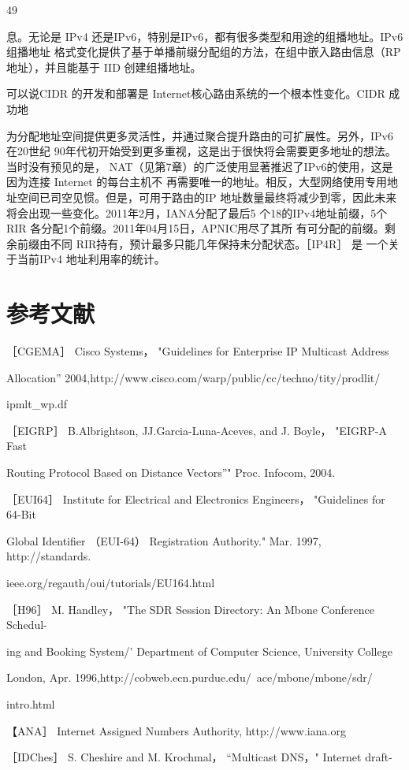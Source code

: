 49

息。无论是 IPv4 还是IPv6，特别是IPv6，都有很多类型和用途的组播地址。IPv6组播地址
格式变化提供了基于单播前缀分配组的方法，在组中嵌入路由信息（RP地址），并且能基于
IID 创建组播地址。

可以说CIDR 的开发和部署是 Internet核心路由系统的一个根本性变化。CIDR 成功地

为分配地址空间提供更多灵活性，并通过聚合提升路由的可扩展性。另外，IPv6 在20世纪
90年代初开始受到更多重视，这是出于很快将会需要更多地址的想法。当时没有预见的是，
NAT（见第7章）的广泛使用显著推迟了IPv6的使用，这是因为连接 Internet 的每台主机不
再需要唯一的地址。相反，大型网络使用专用地址空间已司空见惯。但是，可用于路由的IP
地址数量最终将减少到零，因此未来将会出现一些变化。2011年2月，IANA分配了最后5
个18的IPv4地址前缀，5个 RIR 各分配1个前缀。2011年04月15日，APNIC用尽了其所
有可分配的前缀。剩余前缀由不同 RIR持有，预计最多只能几年保持未分配状态。［IP4R］ 是
一个关于当前IPv4 地址利用率的统计。

\section{参考文献}
［CGEMA］ Cisco Systems， "Guidelines for Enterprise IP Multicast Address

Allocation” 2004,http://www.cisco.com/warp/public/cc/techno/tity/prodlit/

ipmlt\_wp.df

［EIGRP］ B.Albrightson, JJ.Garcia-Luna-Aceves, and J. Boyle， "EIGRP-A Fast

Routing Protocol Based on Distance Vectors”" Proc. Infocom, 2004.

［EUI64］ Institute for Electrical and Electronics Engineers， "Guidelines for 64-Bit

Global Identifier （EUI-64） Registration Authority." Mar. 1997, http://standards.

ieee.org/regauth/oui/tutorials/EU164.html

［H96］ M. Handley， "The SDR Session Directory: An Mbone Conference Schedul-

ing and Booking System/' Department of Computer Science, University College

London, Apr. 1996,http://cobweb.ecn.purdue.edu/~ace/mbone/mbone/sdr/

intro.html

【ANA］ Internet Assigned Numbers Authority, http://www.iana.org

［IDChes］ S. Cheshire and M. Krochmal， “Multicast DNS，" Internet draft-

